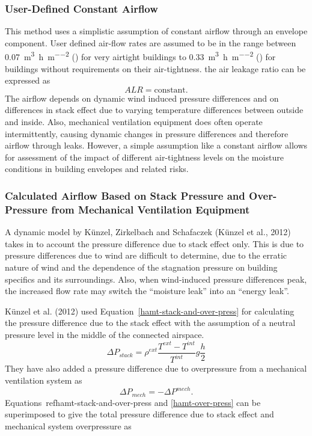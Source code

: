 \subsubsection{User-Defined Constant Airflow }
This method uses a simplistic assumption of constant airflow through an
envelope component. User defined air-flow rates are assumed to be in the range
between \SI{0.07}{\meter\cubed\per\hour\per\meter\squared}
() for very airtight buildings to
\SI{0.33}{\meter\cubed\per\hour\per\meter\squared}
() for buildings without requirements on their
 air-tightness. the air leakage ratio can be expressed as
%
\begin{equation}\label{ALRconstant}
ALR = \text{constant}.
\end{equation}
%
The airflow depends on dynamic wind induced pressure differences and on
differences in stack effect due to varying temperature differences between
outside and inside. Also, mechanical ventilation equipment does often operate
intermittently, causing dynamic changes in pressure differences and therefore
airflow through leaks. However, a simple assumption like a constant airflow
allows for assessment of the impact of different air-tightness levels on the
moisture conditions in building envelopes and related risks.

\subsubsection{Calculated Airflow Based on Stack Pressure and Over-Pressure from Mechanical Ventilation Equipment}
A  dynamic model by K\"unzel, Zirkelbach and Schafaczek (K\"unzel et al., 2012)
 takes in to account the pressure difference due to stack effect only. This is due
 to pressure differences due to wind are difficult to determine, due to the erratic
 nature of wind and the dependence of the stagnation pressure on building
 specifics and its surroundings. Also, when wind-induced pressure differences
 peak, the increased flow rate may switch the ``moisture leak'' into an
``energy leak''.

K\"unzel et al. (2012) used Equation~\ref{hamt-stack-and-over-press} for calculating
the pressure difference due to the stack effect with the assumption of a neutral
pressure level in the middle of the connected airspace.
%
\begin{equation}\label{hamt-stack-and-over-press}
\Delta P_{stack}= \rho ^{ext}\frac{T^{ext}-T^{int}}{T^{int}} g \frac{h}{2}
\end{equation}
%
They have also added a pressure difference due to overpressure from a
mechanical ventilation system as
%
\begin{equation}\label{hamt-over-press}
\Delta P_{mech}=-\Delta P^{mech}.
\end{equation}
%
Equations~ref{hamt-stack-and-over-press} and \ref{hamt-over-press} can be
superimposed to give the total pressure difference due to stack effect and
mechanical system overpressure as

